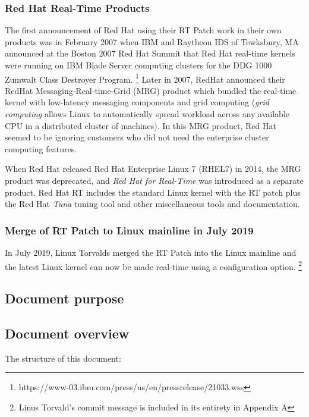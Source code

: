 \documentclass[12pt]{article}
\begin{document}
\subsubsection{Red Hat Real-Time Products}
The first announcement of Red Hat using their RT Patch work in their own
products was in February 2007 when IBM and Raytheon IDS of Tewksbury, MA
announced at the Boston 2007 Red Hat Summit that Red Hat real-time kernels were
running on IBM Blade Server computing clusters for the DDG 1000 Zumwalt Class
Destroyer Program.%
\footnote{https://www-03.ibm.com/press/us/en/pressrelease/21033.wss}
Later in 2007, RedHat announced their RedHat Messaging-Real-time-Grid (MRG)
product which bundled the real-time kernel with low-latency messaging components
and grid computing (\emph{grid computing} allows Linux to automatically spread
workload across any available CPU in a distributed cluster of machines).  In
this MRG product, Red Hat seemed to be ignoring customers who did not need the
enterprise cluster computing features.

When Red Hat released Red Hat Enterprise Linux 7 (RHEL7) in 2014, the MRG
product was deprecated, and \emph{Red Hat for Real-Time} was introduced as a
separate product.  Red Hat RT includes the standard Linux kernel with the RT
patch plus the Red Hat \emph{Tuna} tuning tool and other miscellaneous tools and
documentation.

\subsubsection{Merge of RT Patch to Linux mainline in July 2019}
In July 2019, Linux Torvalds merged the RT Patch into the Linux mainline and the
latest Linux kernel can now be made real-time using a configuration option.%
\footnote{Linus Torvald's commit message is included in its entirety in Appendix
A}


\subsection{Document purpose}
%


\subsection{Document overview}
The structure of this document:
\end{document}
